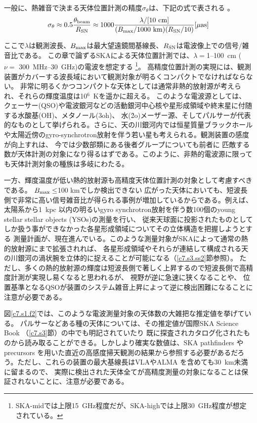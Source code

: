 一般に、熱雑音で決まる天体位置計測の精度$\sigma_\theta $は、下記の式で表される\citep{1993LNP...412..244M} 。
\begin{equation}
\sigma_\theta \approx 0.5\frac{\theta_{\rm beam}}{R_{\rm SN}}
\approx 1000\frac{\lambda/{\rm[10~cm]}}{(B_{\rm max}/{\rm 1000~km})(R_{\rm SN}/10)} [\mu{\rm as}]
\label{eq:accuracy}
\end{equation}

\noindent
ここで$\lambda$は観測波長、$B_{\rm max}$は最大望遠鏡間基線長、$R_{\rm SN}$は電波像上での信号/雑音比である。
この章で論ずるSKAによる天体位置計測では、$\lambda=$1--100~cm ($\nu=$ 300~MHz--30~GHz)の電波を想定する
\footnote{SKA-midでは上限15~GHz程度だが、SKA-highでは上限30~GHz程度が想定されている。}。
高精度位置計測の実現には、観測装置がカバーする波長域において観測対象が明るくコンパクトでなければならない。
非常に明るくかつコンパクトな天体としては通常非熱的放射源が考えられ、それらの輝度温度は10$^{6}$~Kを遥かに超える。
このような電波源としては、
クェーサー(QSO)や電波銀河などの活動銀河中心核や星形成領域や終末星に付随する水酸基(OH)、メタノール(\ch3oh)、
水(\h2o)メーザー源、そしてパルサーが代表的なものとして挙げられる。さらに、天の川銀河内では恒星質量ブラックホール
や太陽近傍のgyro-synchrotron放射を伴う若い星も考えられる。観測装置の感度が向上すれは、
今では少数部類にある後者グループについても前者に
匹敵する数が天体計測の対象になり得るはずである。このように、非熱的電波源に限っても天体計測対象の種族は多岐にわたる。

一方、輝度温度が低い熱的放射源も高精度天体位置計測の対象として考慮すべきである。
$B_{\rm max}\leq$100 kmでしか検出できない
広がった天体においても、短波長側で非常に高い信号雑音比が得られる事例が増加しているからである。例えば、
太陽系から1~kpc 以内の明るいgyro synchrotron放射を伴う数100個のyoung stellar stellar objects (YSOs)の測量を行い、
従来天球面に投影されたものとしてしか扱う事ができなかった各星形成領域についてその立体構造を把握しようとする
測量計画が、現在進んでいる\citep{2013IAUS..289...36L}。このような測量対象がSKAによって通常の熱的放射源にまで拡張されれば、
各星形成領域やそれらが連結して構成される天の川銀河の渦状腕を立体的に捉えることが可能になる（\ref{c7.s3.ss2}節参照）。
ただし、多くの熱的放射源の輝度は短波長側で著しく上昇するので短波長側で高精度計測が実現し易くなると思われるが、
視野が逆に急速に狭くなることや、
位置基準となるQSOが装置のシステム雑音上昇によって逆に検出困難になることに注意が必要である。

図\ref{c7.s1.f2}では、このような電波測量対象の天体数の大雑把な推定値を挙げている。
パルサーなどある種の天体については、その推定値が国際SKA Science Book （\ref{c7.s3}節）の中でも明記されていたり
既に探査されカタログ化されたものから読み取ることができる。しかしより確実な数値は、SKA pathfinders や precursors 
を用いた直近の高感度掃天観測の結果から参照する必要があるだろう。ただし、これらの装置の最大基線長はVLAやALMA
を含めても30~km未満に留まるので、
実際に検出された天体全てが高精度測量の対象になることは保証されないことに、注意が必要である。


